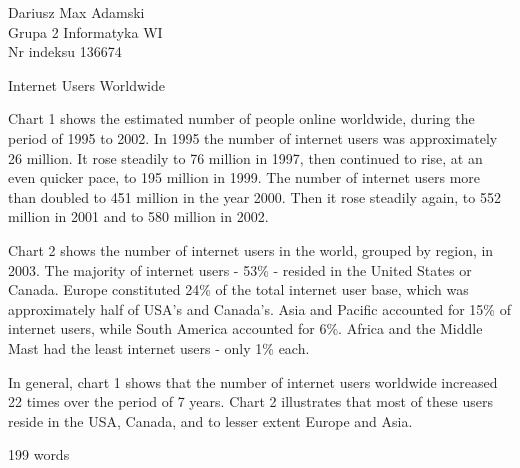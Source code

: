 \documentclass[12pt]{article}
\begin{document}
\begin{flushleft} 
	Dariusz Max Adamski \\
	Grupa 2 Informatyka WI\\
	Nr indeksu 136674
\end{flushleft}

\begin{center} 
	\vspace{0.8cm} \Large
	Internet Users Worldwide
	\vspace{0.5cm}
\end{center}

Chart 1 shows the estimated number of people online worldwide, during the period of 1995 to 2002. In 1995 the number of internet users was approximately 26 million. It rose steadily to 76 million in 1997, then continued to rise, at an even quicker pace, to 195 million in 1999. The number of internet users more than doubled to 451 million in the year 2000. Then it rose steadily again, to 552 million in 2001 and to 580 million in 2002.

Chart 2 shows the number of internet users in the world, grouped by region, in 2003. The majority of internet users - 53\% - resided in the United States or Canada. Europe constituted 24\% of the total internet user base, which was approximately half of USA’s and Canada’s. Asia and Pacific accounted for 15\% of internet users, while South America accounted for 6\%. Africa and the Middle Mast had the least internet users - only 1\% each.

In general, chart 1 shows that the number of internet users worldwide increased 22 times over the period of 7 years. Chart 2 illustrates that most of these users reside in the USA, Canada, and to lesser extent Europe and Asia.

199 words
\end{document}
